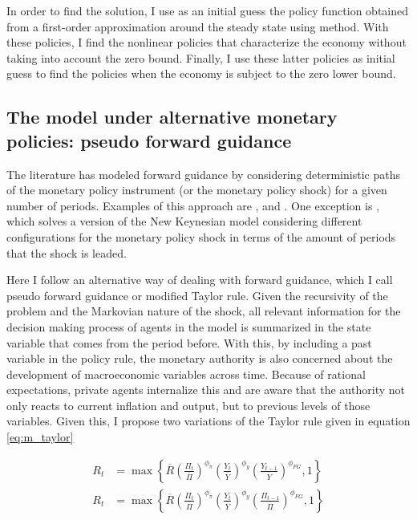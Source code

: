\documentclass[12pt]{article}
\numberwithin{equation}{section}
\begin{document}
In order to find the solution, I use as an initial guess the policy function obtained from a first-order approximation around the steady state using \cite{Sims2002} method. With these policies, I find the nonlinear policies that characterize the economy without taking into account the zero bound. Finally, I use these latter policies as initial guess to find the policies when the economy is subject to the zero lower bound.

\subsection{The model under alternative monetary policies: pseudo forward guidance}

The literature has modeled forward guidance by considering deterministic paths of the monetary policy instrument (or the monetary policy shock) for a given number of periods. Examples of this approach are \cite{DelNegroEtAl2015}, \cite{KaplanEtAl2016} and \cite{McKayEtAl2016}. One exception is \cite{KeenEtAl2016}, which solves a version of the New Keynesian model considering different configurations for the monetary policy shock in terms of the amount of periods that the shock is leaded.

Here I follow an alternative way of dealing with forward guidance, which I call pseudo forward guidance or modified Taylor rule. Given the recursivity of the problem and the Markovian nature of the shock, all relevant information for the decision making process of agents in the model is summarized in the state variable that comes from the period before. With this, by including a past variable in the policy rule, the monetary authority is also concerned about the development of macroeconomic variables across time. Because of rational expectations, private agents internalize this and are aware that the authority not only reacts to current inflation and output, but to previous levels of those variables. Given this, I propose two variations of the Taylor rule given in equation \eqref{eq:m_taylor}

\begin{align}
	R_t&=\max\left\{\overline R\left(\frac{\Pi_t}{\overline\Pi}\right)^{\phi_{\pi}}\left(\frac{Y_t}{\overline{Y}}\right)^{\phi_{y}}\left(\frac{Y_{t-1}}{\overline{Y}}\right)^{\phi_{FG}},1\right\}\label{eq:m_taylor_fg1}\\
	R_t&=\max\left\{\overline R\left(\frac{\Pi_t}{\overline\Pi}\right)^{\phi_{\pi}}\left(\frac{Y_t}{\overline{Y}}\right)^{\phi_{y}}\left(\frac{\Pi_{t-1}}{\overline\Pi}\right)^{\phi_{FG}},1\right\}\label{eq:m_taylor_fg2}
\end{align}
\end{document}
